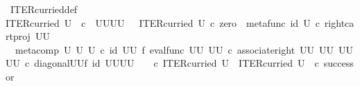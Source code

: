 \begin{isabellebody}
\isanewline
{}\isamarkupfalse%
\ ITER{\isacharunderscore}{\kern0pt}curried{\isacharunderscore}{\kern0pt}def{}{\isacharcolon}{\kern0pt}\ \isanewline
{\isachardoublequoteopen}ITER{\isacharunderscore}{\kern0pt}curried\ U\ {\isacharcolon}{\kern0pt}\ {\isasymnat}\isactrlsub c\ {\isasymrightarrow}\ {\isacharparenleft}{\kern0pt}U\isactrlbsup U\isactrlesup {\isacharparenright}{\kern0pt}\isactrlbsup U\isactrlbsup U\isactrlesup \isactrlesup \ {\isasymand}\ \ ITER{\isacharunderscore}{\kern0pt}curried\ U\ {\isasymcirc}\isactrlsub c\ zero\ {\isacharequal}{\kern0pt}\ {\isacharparenleft}{\kern0pt}metafunc\ {\isacharparenleft}{\kern0pt}id\ U{\isacharparenright}{\kern0pt}\ {\isasymcirc}\isactrlsub c\ {\isacharparenleft}{\kern0pt}right{\isacharunderscore}{\kern0pt}cart{\isacharunderscore}{\kern0pt}proj\ {\isacharparenleft}{\kern0pt}U\isactrlbsup U\isactrlesup {\isacharparenright}{\kern0pt}\ {\isasymone}{\isacharparenright}{\kern0pt}{\isacharparenright}{\kern0pt}\isactrlsup {\isasymsharp}\ {\isasymand}\isanewline
\ \ {\isacharparenleft}{\kern0pt}{\isacharparenleft}{\kern0pt}meta{\isacharunderscore}{\kern0pt}comp\ U\ U\ U{\isacharparenright}{\kern0pt}\ {\isasymcirc}\isactrlsub c\ {\isacharparenleft}{\kern0pt}id\ {\isacharparenleft}{\kern0pt}U\isactrlbsup U\isactrlesup {\isacharparenright}{\kern0pt}\ {\isasymtimes}\isactrlsub f\ eval{\isacharunderscore}{\kern0pt}func\ {\isacharparenleft}{\kern0pt}U\isactrlbsup U\isactrlesup {\isacharparenright}{\kern0pt}\ {\isacharparenleft}{\kern0pt}U\isactrlbsup U\isactrlesup {\isacharparenright}{\kern0pt}{\isacharparenright}{\kern0pt}\ {\isasymcirc}\isactrlsub c\ {\isacharparenleft}{\kern0pt}associate{\isacharunderscore}{\kern0pt}right\ {\isacharparenleft}{\kern0pt}U\isactrlbsup U\isactrlesup {\isacharparenright}{\kern0pt}\ {\isacharparenleft}{\kern0pt}U\isactrlbsup U\isactrlesup {\isacharparenright}{\kern0pt}\ {\isacharparenleft}{\kern0pt}{\isacharparenleft}{\kern0pt}U\isactrlbsup U\isactrlesup {\isacharparenright}{\kern0pt}\isactrlbsup U\isactrlbsup U\isactrlesup \isactrlesup {\isacharparenright}{\kern0pt}{\isacharparenright}{\kern0pt}\ {\isasymcirc}\isactrlsub c\ {\isacharparenleft}{\kern0pt}diagonal{\isacharparenleft}{\kern0pt}U\isactrlbsup U\isactrlesup {\isacharparenright}{\kern0pt}{\isasymtimes}\isactrlsub f\ id\ {\isacharparenleft}{\kern0pt}{\isacharparenleft}{\kern0pt}U\isactrlbsup U\isactrlesup {\isacharparenright}{\kern0pt}\isactrlbsup U\isactrlbsup U\isactrlesup \isactrlesup {\isacharparenright}{\kern0pt}{\isacharparenright}{\kern0pt}{\isacharparenright}{\kern0pt}\isactrlsup {\isasymsharp}\ \ \ \ {\isasymcirc}\isactrlsub c\ ITER{\isacharunderscore}{\kern0pt}curried\ U\ {\isacharequal}{\kern0pt}\ ITER{\isacharunderscore}{\kern0pt}curried\ U\ \ {\isasymcirc}\isactrlsub c\ successor{\isachardoublequoteclose}\isanewline

\end{isabellebody}
